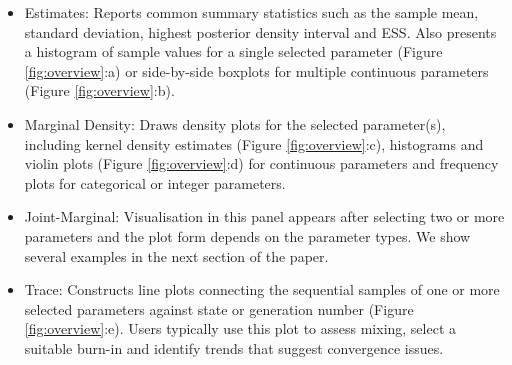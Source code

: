 \documentclass{bioinfo}
\begin{document}
\begin{itemize}

\item Estimates: Reports common summary statistics such as the sample mean, standard deviation, highest posterior density interval and ESS.  Also presents a histogram of sample values for a single selected parameter (Figure \ref{fig:overview}:a) or  side-by-side boxplots for multiple continuous parameters (Figure \ref{fig:overview}:b).

\item Marginal Density: Draws density plots for the selected parameter(s), including  kernel density estimates (Figure \ref{fig:overview}:c), histograms and violin plots (Figure \ref{fig:overview}:d) for continuous parameters and frequency plots for categorical or integer parameters.

\item Joint-Marginal: Visualisation in this panel appears after selecting two or more parameters and the plot form depends on the parameter types. We show several examples in the next section of the paper.

\item Trace: Constructs line plots connecting the sequential samples of one or more selected parameters against state or generation number (Figure \ref{fig:overview}:e).  Users typically use this plot to assess mixing, select a suitable burn-in and identify trends that suggest convergence issues.
\end{itemize}
%
\end{document}
